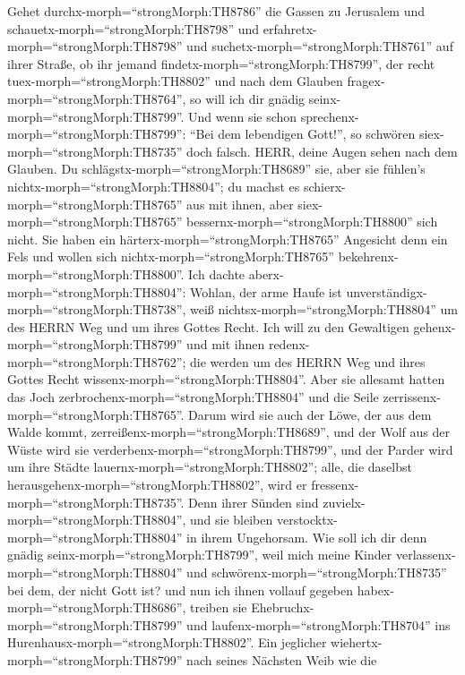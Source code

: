  Gehet durchx-morph=``strongMorph:TH8786'' die Gassen zu
Jerusalem und schauetx-morph=``strongMorph:TH8798'' und
erfahretx-morph=``strongMorph:TH8798'' und
suchetx-morph=``strongMorph:TH8761'' auf ihrer Straße, ob ihr jemand
findetx-morph=``strongMorph:TH8799'', der recht
tuex-morph=``strongMorph:TH8802'' und nach dem Glauben
fragex-morph=``strongMorph:TH8764'', so will ich dir gnädig
seinx-morph=``strongMorph:TH8799''.  Und wenn sie schon
sprechenx-morph=``strongMorph:TH8799'': ``Bei dem lebendigen Gott!'', so
schwören siex-morph=``strongMorph:TH8735'' doch falsch. 
HERR, deine Augen sehen nach dem Glauben. Du
schlägstx-morph=``strongMorph:TH8689'' sie, aber sie fühlen's
nichtx-morph=``strongMorph:TH8804''; du machst es
schierx-morph=``strongMorph:TH8765'' aus mit ihnen, aber
siex-morph=``strongMorph:TH8765'' bessernx-morph=``strongMorph:TH8800''
sich nicht. Sie haben ein härterx-morph=``strongMorph:TH8765'' Angesicht
denn ein Fels und wollen sich nichtx-morph=``strongMorph:TH8765''
bekehrenx-morph=``strongMorph:TH8800''.  Ich dachte
aberx-morph=``strongMorph:TH8804'': Wohlan, der arme Haufe ist
unverständigx-morph=``strongMorph:TH8738'', weiß
nichtsx-morph=``strongMorph:TH8804'' um des HERRN Weg und um ihres
Gottes Recht.  Ich will zu den Gewaltigen
gehenx-morph=``strongMorph:TH8799'' und mit ihnen
redenx-morph=``strongMorph:TH8762''; die werden um des HERRN Weg und
ihres Gottes Recht wissenx-morph=``strongMorph:TH8804''. Aber sie
allesamt hatten das Joch zerbrochenx-morph=``strongMorph:TH8804'' und
die Seile zerrissenx-morph=``strongMorph:TH8765''.  Darum
wird sie auch der Löwe, der aus dem Walde kommt,
zerreißenx-morph=``strongMorph:TH8689'', und der Wolf aus der Wüste wird
sie verderbenx-morph=``strongMorph:TH8799'', und der Parder wird um ihre
Städte lauernx-morph=``strongMorph:TH8802''; alle, die daselbst
herausgehenx-morph=``strongMorph:TH8802'', wird er
fressenx-morph=``strongMorph:TH8735''. Denn ihrer Sünden sind
zuvielx-morph=``strongMorph:TH8804'', und sie bleiben
verstocktx-morph=``strongMorph:TH8804'' in ihrem Ungehorsam.
 Wie soll ich dir denn gnädig
seinx-morph=``strongMorph:TH8799'', weil mich meine Kinder
verlassenx-morph=``strongMorph:TH8804'' und
schwörenx-morph=``strongMorph:TH8735'' bei dem, der nicht Gott ist? und
nun ich ihnen vollauf gegeben habex-morph=``strongMorph:TH8686'',
treiben sie Ehebruchx-morph=``strongMorph:TH8799'' und
laufenx-morph=``strongMorph:TH8704'' ins
Hurenhausx-morph=``strongMorph:TH8802''.  Ein jeglicher
wiehertx-morph=``strongMorph:TH8799'' nach seines Nächsten Weib wie die

